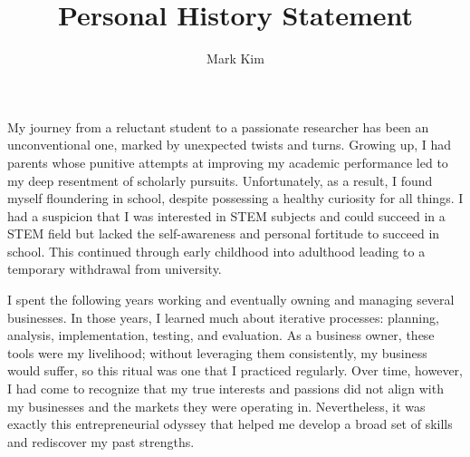 \documentclass[12pt]{article}
\author{Mark Kim}
\title{Personal History Statement}
\begin{document}
\maketitle



My journey from a reluctant student to a passionate researcher has been an unconventional one, marked by unexpected twists and turns.
Growing up, I had parents whose punitive attempts at improving my academic performance led to my deep resentment of scholarly pursuits.
Unfortunately, as a result, I found myself floundering in school, despite possessing a healthy curiosity for all things. I had a suspicion
that I was interested in STEM subjects and could succeed in a STEM field but lacked the self-awareness and personal fortitude to succeed in
school. This continued through early childhood into adulthood leading to a temporary withdrawal from university.

I spent the following years working and eventually owning and managing several businesses. In those years, I learned much about iterative
processes: planning, analysis, implementation, testing, and evaluation. As a business owner, these tools were my livelihood; without
leveraging them consistently, my business would suffer, so this ritual was one that I practiced regularly. Over time, however, I had come to
recognize that my true interests and passions did not align with my businesses and the markets they were operating in. Nevertheless, it was
exactly this entrepreneurial odyssey that helped me develop a broad set of skills and rediscover my past strengths.
\end{document}
